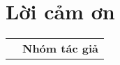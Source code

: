 \chapter*{Lời cảm ơn}




{
\begin{table}[ht]
\centering
\begin{tabular}{>{\centering}m{}>{\centering\arraybackslash}m{}}
 & \textbf{Nhóm tác giả}
\end{tabular}
\end{table}
}